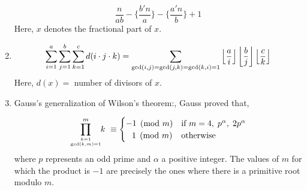 \begin{enumerate}
                \[\displaystyle \frac{n}{ab}-\Big\{\frac{b{\prime} n}{a}\Big\}-\Big\{\frac{a{\prime} n}{b}\Big\} + 1\]
                Here, $\displaystyle {x}$ denotes the fractional part of $\displaystyle x$.

            
            \item 
                \[\displaystyle \displaystyle \sum \limits_{i=1}^{a}\sum \limits_{j=1}^{b}\sum \limits_{k=1}^{c} d(i
                \cdot j
                \cdot k) = \sum \limits_{\gcd (i,j)=\gcd (j,k) = \gcd (k,i) =1} \left \lfloor \dfrac{a}{i}\right \rfloor
                \left
                \lfloor \dfrac{b}{j}\right \rfloor \left \lfloor \dfrac{c}{k} \right \rfloor\]
                Here, $d(x) =$ number of divisors of $\displaystyle x$.

            
            \item 
                Gauss’s generalization of Wilson’s theorem:,
                    Gauss proved that,

                \[\displaystyle \displaystyle \prod \limits_{k=1 \atop \gcd(k,m)=1}^{m}\!\!k\ \equiv
                {\begin{cases}-1{\pmod
                {m}}&{\text{if }}m=4,\;p^{\alpha },\;2p^{\alpha }\\\;\;\,1{\pmod
                {m}}&{\text{otherwise}}\end{cases}}\]
                where $\displaystyle p$ represents an odd prime and $\displaystyle \alpha$ a positive integer. The
                    values
                    of
                    $m$ for which the product is $-1$ are precisely the ones where there is a primitive root modulo $m$.
                

                \end{enumerate}
